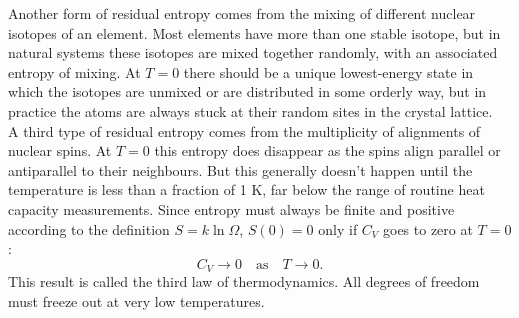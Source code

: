 \documentclass[11pt]{exam}
\begin{document}
\hspace*{10mm}Another form of residual entropy comes from the mixing of different nuclear isotopes of an element. Most elements have more than one stable isotope, but in natural systems these isotopes are mixed together randomly, with an associated entropy of mixing. At $T=0$ there should be a unique lowest-energy state in which the isotopes are unmixed or are distributed in some orderly way, but in practice the atoms are always stuck at their random sites in the crystal lattice.\\
\hspace*{10mm}A third type of residual entropy comes from the multiplicity of alignments of nuclear spins. At $T=0$ this entropy does disappear as the spins align parallel or antiparallel to their neighbours. But this generally doesn't happen until the temperature is less than a fraction of 1 K, far below the range of routine heat capacity measurements. 
Since entropy must always be finite and positive according to the definition $S=k\ln{\Omega}$, $S(0)=0$ only if $C_V$ goes to zero at $T=0$:
\begin{equation}\tag{3.22}
C_V \rightarrow 0\quad\text{as}\quad T\rightarrow 0. 
\end{equation}
This result is called the third law of thermodynamics. All degrees of freedom must freeze out at very low temperatures.
\newpage 
\end{document}
